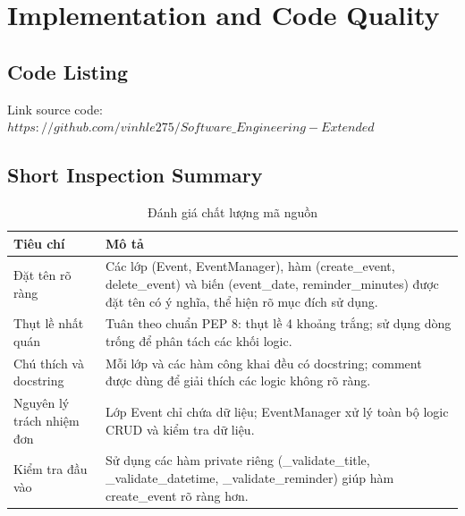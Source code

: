 \section{Implementation and Code Quality}
\subsection{Code Listing}
Link source code: \href{https://github.com/vinhle275/Software_Engineering-Extended}{$https://github.com/vinhle275/Software\_Engineering-Extended$}
\subsection{Short Inspection Summary}

\begin{table}[H]
\centering
\begin{tabularx}{\linewidth}{|l|X|}
\hline
\textbf{Tiêu chí} & \textbf{Mô tả} \\
\hline
Đặt tên rõ ràng & Các lớp (Event, EventManager), hàm (create\_event, delete\_event) và biến (event\_date, reminder\_minutes) được đặt tên có ý nghĩa, thể hiện rõ mục đích sử dụng. \\
\hline
Thụt lề nhất quán & Tuân theo chuẩn PEP 8: thụt lề 4 khoảng trắng; sử dụng dòng trống để phân tách các khối logic. \\
\hline
Chú thích và docstring & Mỗi lớp và các hàm công khai đều có docstring; comment được dùng để giải thích các logic không rõ ràng. \\
\hline
Nguyên lý trách nhiệm đơn & Lớp Event chỉ chứa dữ liệu; EventManager xử lý toàn bộ logic CRUD và kiểm tra dữ liệu. \\
\hline
Kiểm tra đầu vào & Sử dụng các hàm private riêng (\_validate\_title, \_validate\_datetime, \_validate\_reminder) giúp hàm create\_event rõ ràng hơn. \\
\hline
\end{tabularx}
\caption{Đánh giá chất lượng mã nguồn}
\end{table}

